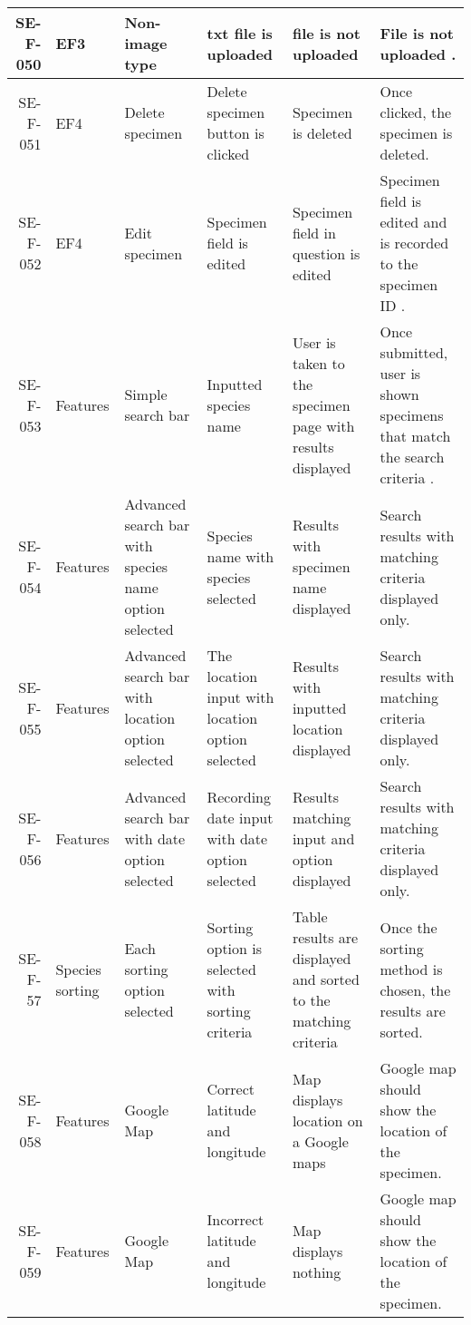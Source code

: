 \begin{landscape}
\begin{longtable}{|r|l|p{4cm}|p{4cm}|p{4cm}|p{4cm}|}
SE-F-050 & EF3 & Non-image type & txt file is uploaded & file is not uploaded & File is not uploaded . \\ \hline
				
SE-F-051 & EF4 & Delete specimen & Delete specimen button is clicked & Specimen is deleted & Once clicked, the specimen is deleted. \\ \hline
			
SE-F-052 & EF4 & Edit specimen & Specimen field is edited & Specimen field in question is edited & Specimen field is edited and is recorded to the specimen ID  . \\ \hline
			
SE-F-053 & Features & Simple search bar & Inputted species name & User is taken to the specimen page with results displayed & Once submitted, user is shown specimens that match the search criteria  . \\ \hline
		
SE-F-054 & Features & Advanced search bar with species name option selected& Species name with species selected & Results with specimen name displayed & Search results with matching criteria displayed only. \\ \hline

SE-F-055 & Features & Advanced search bar with location option selected & The location input with location option selected & Results with inputted location displayed & Search results with matching criteria displayed only.\\ \hline

SE-F-056 & Features & Advanced search bar with date option selected & Recording date input with date option selected & Results matching input and option displayed & Search results with matching criteria displayed only. \\ \hline
		
SE-F-57 & Species sorting & Each sorting option selected & Sorting option is selected with sorting criteria & Table results are displayed and sorted to the matching criteria & Once the sorting method is chosen, the results are sorted. \\ \hline
			
SE-F-058 & Features & Google Map & Correct latitude and  longitude & Map displays location on a Google maps & Google map should show the location of the specimen.\\ \hline

SE-F-059 & Features & Google Map & Incorrect latitude and  longitude & Map displays nothing & Google map should show the location of the specimen. \\ \hline
\end{longtable}


\end{landscape}
